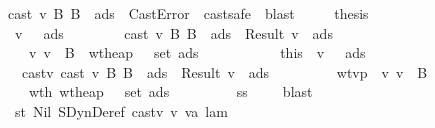 \begin{isabellebody}
\ \ \ \ \ \ cast\ v{}\ B{\isacharprime}\ B\ {\isasymmu}\ ads\ {\isacharequal}\ CastError{\isachardoublequoteclose}\ \isamarkupfalse \ cast{\isacharunderscore}safe\ \isamarkupfalse \ blast\isanewline
\ \ \ \ \isamarkupfalse \ {\isacharquery}thesis\isanewline
\ \ \ \ \isamarkupfalse \isanewline
\ \ \ \ \ \ \isamarkupfalse \ {\isachardoublequoteopen}{\isacharparenleft}{\isasymexists}v{\isacharprime}\ {\isasymSigma}{\isacharprime}\ {\isasymmu}{\isacharprime}\ ads{}{\isachardot}\isanewline
\ \ \ \ \ \ \ \ cast\ v{}\ B{\isacharprime}\ B\ {\isasymmu}\ ads\ {\isacharequal}\ Result\ {\isacharparenleft}v{\isacharprime}{\isacharcomma}\ {\isasymmu}{\isacharprime}{\isacharcomma}\ ads{}{\isacharparenright}\ {\isasymand}\isanewline
\ \ \ \ \ \ \ \ {\isasymSigma}{\isacharprime}\ {\isasymturnstile}v\ v{\isacharprime}\ {\isacharcolon}\ B\ {\isasymand}\ wt{\isacharunderscore}heap\ {\isasymSigma}{\isacharprime}\ {\isasymmu}{\isacharprime}\ {\isacharparenleft}set\ ads{}{\isacharparenright}\ {\isasymand}\ {\isasymSigma}{\isacharprime}\ {\isasymsqsubseteq}\ {\isasymSigma}{\isacharparenright}{\isachardoublequoteclose}\isanewline
\ \ \ \ \ \ \isamarkupfalse \ this\ \isamarkupfalse \ v{\isacharprime}\ {\isasymSigma}{\isacharprime}\ {\isasymmu}{\isacharprime}\ ads{}\ \isanewline
\ \ \ \ \ \ \ \ castv{}{\isacharcolon}\ {\isachardoublequoteopen}cast\ v{}\ B{\isacharprime}\ B\ {\isasymmu}\ ads\ {\isacharequal}\ Result\ {\isacharparenleft}v{\isacharprime}{\isacharcomma}\ {\isasymmu}{\isacharprime}{\isacharcomma}\ ads{}{\isacharparenright}{\isachardoublequoteclose}\isanewline
\ \ \ \ \ \ \ \ \ wtvp{\isacharcolon}\ {\isachardoublequoteopen}{\isasymSigma}{\isacharprime}\ {\isasymturnstile}v\ v{\isacharprime}\ {\isacharcolon}\ B{\isachardoublequoteclose}\isanewline
\ \ \ \ \ \ \ \ \ wth{}{\isacharcolon}\ {\isachardoublequoteopen}wt{\isacharunderscore}heap\ {\isasymSigma}{\isacharprime}\ {\isasymmu}{\isacharprime}\ {\isacharparenleft}set\ ads{}{\isacharparenright}{\isachardoublequoteclose}\isanewline
\ \ \ \ \ \ \ \ \ ss{\isacharcolon}\ {\isachardoublequoteopen}{\isasymSigma}{\isacharprime}\ {\isasymsqsubseteq}\ {\isasymSigma}{\isachardoublequoteclose}\ \isamarkupfalse \ blast\isanewline
\ \ \ \ \ \ \isamarkupfalse \ st\ Nil\ SDynDeref\ castv{}\ v\ va\ lam\isanewline

\end{isabellebody}
